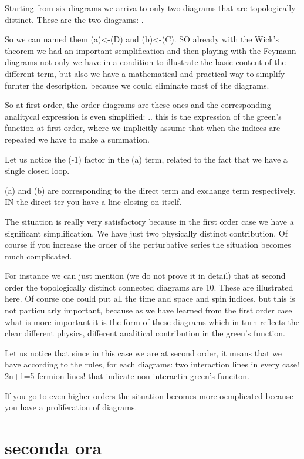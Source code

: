 \documentclass[../main/main.tex]{subfiles}
\begin{document}
Starting from six diagrams we arriva to only two diagrams that are topologically distinct. These are the two diagrams:
.

So we can named them (a)<-(D) and (b)<-(C). SO already with the Wick's theorem we had an important semplification and then playing with the Feymann diagrams not only we have in a condition to illustrate the basic content of the different term, but also we have a mathematical and practical way to simplify furhter the description, because we could eliminate most of the diagrams.

So at first order, the order diagrams are these ones and the corresponding analitycal expression is even simplified:
..
this is the expression of the green's function at first order, where we implicitly assume that when the indices are repeated we have to make a summation.

Let us notice the (-1) factor in the (a) term, related to the fact that we have a single closed loop.


(a) and (b) are corresponding to the direct term and exchange term respectively. IN the direct ter you have a line closing on itself.

The situation is really very satisfactory because in the first order case we have a significant simplification. We have just two physically distinct contribution. Of course if you increase the order of the perturbative series the situation becomes much complicated.



For instance we can just mention (we do not prove it in detail) that at second order the topologically distinct connected diagrams are 10. These are illustrated here. Of course one could put all the time and space and spin indices, but this is not particularly important, because as we have learned from the first order case what is more important it is the form of these diagrams which in turn reflects the clear different physics, different analitical contribution in the green's function.


Let us notice that since in this case  we are at second order, it means that we have according to the rules, for each diagrams:
two interaction lines in every case!
2n+1=5 fermion lines! that indicate non interactin green's funciton.

If you go to even higher orders the situation becomes more ocmplicated because you have a proliferation of diagrams.


\section{seconda ora}
\end{document}
